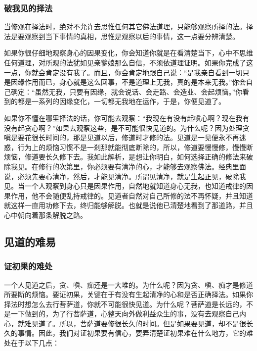 \documentclass{book}
\begin{document}
\subsubsection{破我见的择法}

当修观在择法时，绝对不允许去思惟任何其它佛法道理，只能够观察所择的法。择法是要观察到当下事情的真相，思惟是观察以后的事情，这一点要分辨清楚。

如果你很仔细地观察身心的因果变化，你会知道你就是在看清楚当下，心中不思维任何道理，对所观的法犹如见亲爹娘那么自信，不须依道理证明。如果你完成了这一点，你就会肯定没有我了。而且，你会肯定地跟自己说：``是我亲自看到一切只是因缘作用而已，身心就是这么回事，不是道理上无我，真的是本来无我。''你会自己确定：``虽然无我，只要有因缘，就会说话、会走路、会造业、会起烦恼。''你看到的都是一系列的因缘变化，一切都无我地在运作，于是，你便见道了。

如果你不懂在哪里择法的话，你可能去观察：``我现在有没有起嗔心啊？现在我有没有起贪心啊？''如果去观察这些，是不可能很快见道的。为什么呢？因为处理贪嗔是要花很长时间的，那是见道以后，修道时才修的法。见道是一见便永不再迷惑，行为上的烦恼习惯不是一刹那就能彻底断除的，所以，修道要慢慢修，慢慢断烦恼，修道要长久修下去。我如此解析，是想让你明白，如何选择正确的修法来破除我见。在修行的次第里，你必须要有清净的心，才能够去观察佛法。经典里面说，必须先要心清净，然后，才能见清净。所谓见清净，就是生起正见，破除我见。当一个人观察到身心只是因果作用，自然地就知道身心无我，也知道戒律的因果作用，他不会随便乱持戒律的。见道者自然对自己所修的法不再怀疑，并且知道就这样一直用功修下去，终归能够解脱。也就是说他已清楚地看到了那道路，并且心中朝向着那条解脱之路。

\subsection{见道的难易}

\subsubsection{证初果的难处}

一个人见道之后，贪、嗔、痴还是一大堆的。为什么呢？因为贪、嗔、痴才是修道所要断的烦恼。要证初果，关键在于有没有生起清净的心和是否正确择法。如果你择法时想怎么去行菩萨道，你就不可能很快见道。为什么呢？菩萨道是长远的，不是一下做到的，为了行菩萨道，心整天向外做利益众生的事，没有去观察自己内心，就难见道了。所以，菩萨道要修很长久的时间。但是如果要见道，却不是很长久的事情。因此，我们对证初果要有信心，要弄清楚证初果难在什么地方，它的难处在于以下几点：
\end{document}
